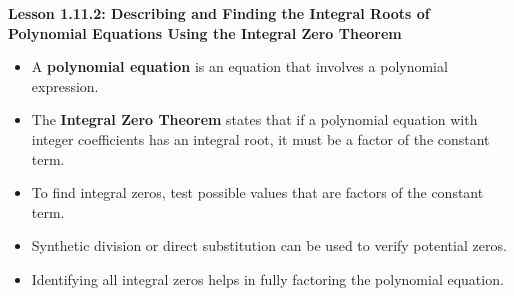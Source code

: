 \begin{center}
\textbf{Lesson 1.11.2: Describing and Finding the Integral Roots of Polynomial Equations Using the Integral Zero Theorem}
\end{center}

\vspace*{-1.5ex}

\begin{itemize}
    \item A \textbf{polynomial equation} is an equation that involves a polynomial expression.
    \item The \textbf{Integral Zero Theorem} states that if a polynomial equation with integer coefficients has an integral root, it must be a factor of the constant term.
    \item To find integral zeros, test possible values that are factors of the constant term.
    \item Synthetic division or direct substitution can be used to verify potential zeros.
    \item Identifying all integral zeros helps in fully factoring the polynomial equation.
\end{itemize}
